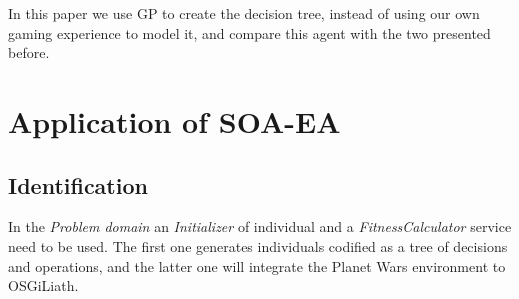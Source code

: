 In this paper we use GP to create the decision tree,
instead of using our own gaming experience to model it, and compare
this agent with the two presented before.  


\section{Application of SOA-EA}

\subsection{Identification}

In the {\em Problem domain} an {\em Initializer} of individual and a {\em FitnessCalculator} service need to be used. The first one generates individuals codified as a tree of decisions and operations, and the latter one will integrate the Planet Wars environment to OSGiLiath.

